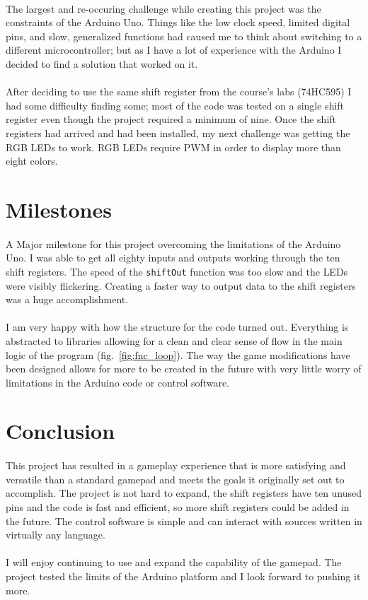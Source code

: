 \documentclass[12pt,a4paper]{article}
\begin{document}
\paragraph{}
The largest and re-occuring challenge while creating this project was the constraints of the Arduino Uno. Things like the low clock speed, limited digital pins, and slow, generalized functions had caused me to think about switching to a different microcontroller; but as I have a lot of experience with the Arduino I decided to find a solution that worked on it.
\paragraph{}
After deciding to use the same shift register from the course's labs (74HC595) I had some difficulty finding some; most of the code was tested on a single shift register even though the project required a minimum of nine. Once the shift registers had arrived and had been installed, my next challenge was getting the \gls{RGB} \glspl{LED} to work. \gls{RGB} \glspl{LED} require \gls{PWM} in order to display more than eight colors.
\section{Milestones}
\paragraph{}
A Major milestone for this project overcoming the limitations of the Arduino Uno. I was able to get all eighty inputs and outputs working through the ten shift registers. The speed of the \texttt{shiftOut} function was too slow and the \glspl{LED} were visibly flickering. Creating a faster way to output data to the shift registers was a huge accomplishment.
\paragraph{}
I am very happy with how the structure for the code turned out. Everything is abstracted to libraries allowing for a clean and clear sense of flow in the main logic of the program (fig.~\ref{fig:fnc_loop}). The way the game modifications have been designed allows for more to be created in the future with very little worry of limitations in the Arduino code or control software.
\section{Conclusion}
\paragraph{}
This project has resulted in a gameplay experience that is more satisfying and versatile than a standard gamepad and meets the goals it originally set out to accomplish. The project is not hard to expand, the shift registers have ten unused pins and the code is fast and efficient, so more shift registers could be added in the future. The control software is simple and can interact with sources written in virtually any language.
\paragraph{}
I will enjoy continuing to use and expand the capability of the gamepad. The project tested the limits of the Arduino platform and I look forward to pushing it more.
\end{document}
